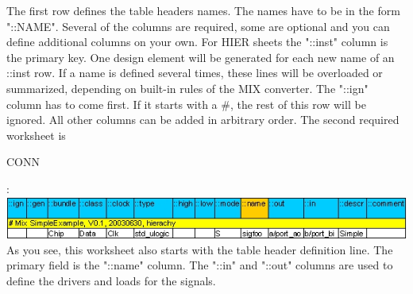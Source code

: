 \documentclass[a4paper,12pt]{article}
\begin{document}
The first row defines the table headers names. The names have to be in the form "::NAME". Several of the columns are required, some are optional and you can define additional columns on your own. For HIER sheets the "::inst" column is the primary key. One design element will be generated for each new name of an ::inst row. If a name is defined several times, these lines will be overloaded or summarized, depending on built-in rules of the MIX converter.\newline
The "::ign" column has to come first. If it starts with a \#, the rest of this row will be ignored. All other columns can be added in arbitrary order.\newline
\newline
The second required worksheet is \begin{bf}CONN\end{bf}:\\
\includegraphics[scale=0.8]{images/mix_simple_2.jpg}\\
As you see, this worksheet also starts with the table header definition line. The primary field is the "::name" column. The "::in" and "::out" columns are used to define the drivers and loads for the signals.
\end{document}
